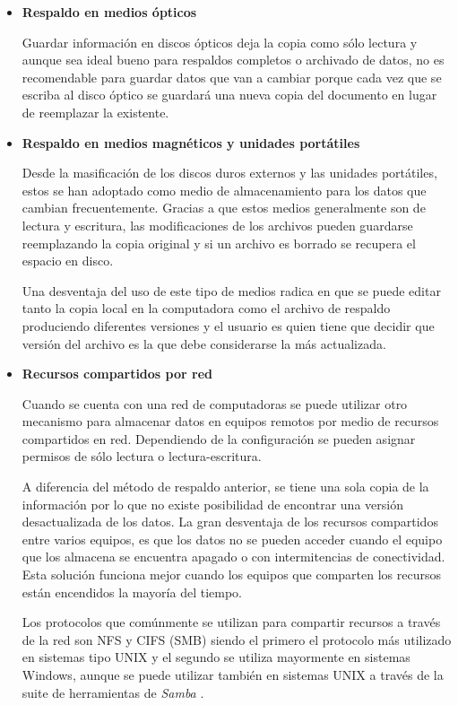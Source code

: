     \begin{itemize}

      \item \textbf{Respaldo en medios \'{opticos}}

Guardar informaci\'{o}n en discos \'{o}pticos deja la copia como s\'{o}lo lectura y aunque sea ideal bueno para respaldos completos o archivado de datos, no es recomendable para guardar datos que van a cambiar porque cada vez que se escriba al disco \'{o}ptico se guardar\'{a} una nueva copia del documento en lugar de reemplazar la existente.

      \item \textbf{Respaldo en medios magn\'{e}ticos y unidades port\'{a}tiles}

Desde la masificaci\'{o}n de los discos duros externos y las unidades port\'{a}tiles, estos se han adoptado como medio de almacenamiento para los datos que cambian frecuentemente. Gracias a que estos medios generalmente son de lectura y escritura, las modificaciones de los archivos pueden guardarse reemplazando la copia original y si un archivo es borrado se recupera el espacio en disco.

Una desventaja del uso de este tipo de medios radica en que se puede editar tanto la copia local en la computadora como el archivo de respaldo produciendo diferentes versiones y el usuario es quien tiene que decidir que versi\'{o}n del archivo es la que debe considerarse la m\'{a}s actualizada.

      \item \textbf{Recursos compartidos por red}

Cuando se cuenta con una red de computadoras se puede utilizar otro mecanismo para almacenar datos en equipos remotos por medio de recursos compartidos en red. Dependiendo de la configuraci\'{o}n se pueden asignar permisos de s\'{o}lo lectura o lectura-escritura.

A diferencia del m\'{e}todo de respaldo anterior, se tiene una sola copia de la informaci\'{o}n por lo que no existe posibilidad de encontrar una versi\'{o}n desactualizada de los datos. La gran desventaja de los recursos compartidos entre varios equipos, es que los datos no se pueden acceder cuando el equipo que los almacena se encuentra apagado o con intermitencias de conectividad. Esta soluci\'{o}n funciona mejor cuando los equipos que comparten los recursos est\'{a}n encendidos la mayor\'{i}a del tiempo.

Los protocolos que com\'{u}nmente se utilizan para compartir recursos a trav\'{e}s de la red son \textsc{NFS} y \textsc{CIFS} (\textsc{SMB}) siendo el primero el protocolo m\'{a}s utilizado en sistemas tipo \textsc{UNIX} y el segundo se utiliza mayormente en sistemas Windows, aunque se puede utilizar tambi\'{e}n en sistemas \textsc{UNIX} a trav\'{e}s de la suite de herramientas de \textit{Samba} \cite{_samba_????}.


\end{itemize}
